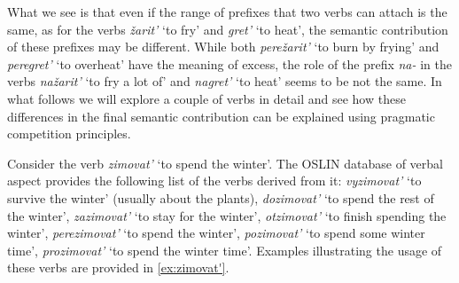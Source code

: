 What we see is that even if the range of prefixes that two verbs can attach is the same, as for the verbs \textit{\v{z}arit'} `to fry' and \textit{gret'} `to heat', the semantic contribution of these prefixes may be different. While both \textit{pere\v{z}arit'} `to burn by frying' and \textit{peregret'} `to overheat' have the meaning of excess, the role of the prefix \textit{na-} in the verbs \textit{na\v{z}arit'} `to fry a lot of' and \textit{nagret'} `to heat' seems to be not the same. In what follows we will explore a couple of verbs in detail and see how these differences in the final semantic contribution can be explained using pragmatic competition principles.

Consider the verb \textit{zimovat'} `to spend the winter'. The OSLIN database of verbal aspect provides the following list of the verbs derived from it: \textit{vyzimovat'} `to survive the winter' (usually about the plants), \textit{dozimovat'} `to spend the rest of the winter', \textit{zazimovat'} `to stay for the winter', \textit{otzimovat'} `to finish spending the winter', \textit{perezimovat'} `to spend the winter', \textit{pozimovat'} `to spend some winter time', \textit{prozimovat'} `to spend the winter time'. Examples illustrating the usage of these verbs are provided in \ref{ex:zimovat'}.

